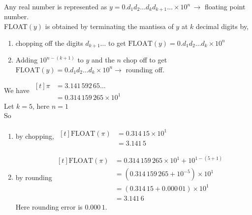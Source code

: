 \documentclass[12pt,class=book,crop=false]{standalone}
\begin{document}
Any real number is represented as \( y=0.d_1d_2\dots d_kd_{k+1}\dots \times10^n \,\rightarrow\) floating point number.\\
FLOAT\( (y) \) is obtained by terminating the mantissa of \( y \) at \( k \) decimal digits by,
\begin{enumerate}
    \item chopping off the digits \( d_{k+1}\dots \) to get
          \( \text{FLOAT}(y)=0.d_1d_2\dots d_k \times10^n \)
    \item Adding \( 10^{n-(k+1)} \) to \( y \) and the \( n \) chop off to get
          \( \text{FLOAT}(y)=0.d_1d_2\dots d_k \times10^n \rightarrow\) rounding off.
\end{enumerate}
\begin{ex}
    We have $ \begin{aligned}[t]
            \pi & =3.141\,592\,65\dots        \\
                & =0.314\,159\,265\times 10^1
        \end{aligned} $\\
    Let \( k=5 \), here \( n=1 \)\\
    So
    \begin{enumerate}[label=(\roman*)]
        \item by chopping, $ \begin{aligned}[t]
                      \text{FLOAT}(\pi) & =0.314\,15\times 10^1 \\
                                        & =3.141\, 5
                  \end{aligned} $
        \item by rounding $ \begin{aligned}[t]
                      \text{FLOAT}(\pi) & =0.314\,159\,265\times 10^1+10^{1-(5+1)} \\
                                        & =(0.314\,159\,265+10^{-5})\times 10^1    \\
                                        & =(0.314\,15+0.000\,01)\times 10^1        \\
                                        & =3.141\,6
                  \end{aligned} $\\
              Here rounding error is \( 0.000\,1 \).
    \end{enumerate}
\end{ex}
\end{document}
